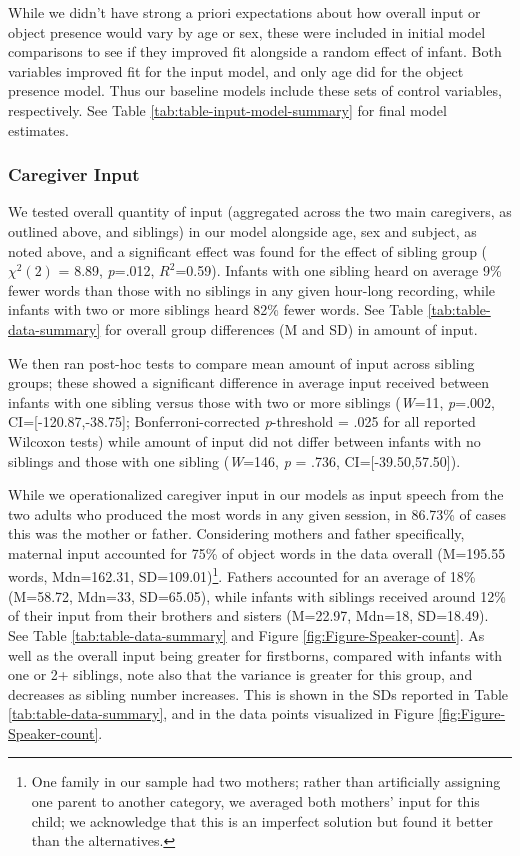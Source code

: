 \documentclass[
  man,mask,floatsintext]{apa6}
\begin{document}
While we didn't have strong a priori expectations about how overall input or object presence would vary by age or sex, these were included in initial model comparisons to see if they improved fit alongside a random effect of infant. Both variables improved fit for the input model, and only age did for the object presence model. Thus our baseline models include these sets of control variables, respectively. See Table \ref{tab:table-input-model-summary} for final model estimates.

\hypertarget{caregiver-input}{%
\subsubsection{Caregiver Input}\label{caregiver-input}}

We tested overall quantity of input (aggregated across the two main caregivers, as outlined above, and siblings) in our model alongside age, sex and subject, as noted above, and a significant effect was found for the effect of sibling group (\(\chi^2 (2)\) = 8.89, \emph{p}=.012, \(R^2\)=0.59). Infants with one sibling heard on average 9\% fewer words than those with no siblings in any given hour-long recording, while infants with two or more siblings heard 82\% fewer words. See Table \ref{tab:table-data-summary} for overall group differences (M and SD) in amount of input.

We then ran post-hoc tests to compare mean amount of input across sibling groups; these showed a significant difference in average input received between infants with one sibling versus those with two or more siblings (\emph{W}=11, \emph{p}=.002, CI={[}-120.87,-38.75{]}; Bonferroni-corrected \emph{p}-threshold = .025 for all reported Wilcoxon tests) while amount of input did not differ between infants with no siblings and those with one sibling (\emph{W}=146, \emph{p} = .736, CI={[}-39.50,57.50{]}).

While we operationalized caregiver input in our models as input speech from the two adults who produced the most words in any given session, in 86.73\% of cases this was the mother or father. Considering mothers and father specifically, maternal input accounted for 75\% of object words in the data overall (M=195.55 words, Mdn=162.31, SD=109.01)\footnote{One family in our sample had two mothers; rather than artificially assigning one parent to another category, we averaged both mothers' input for this child; we acknowledge that this is an imperfect solution but found it better than the alternatives.}. Fathers accounted for an average of 18\% (M=58.72, Mdn=33, SD=65.05), while infants with siblings received around 12\% of their input from their brothers and sisters (M=22.97, Mdn=18, SD=18.49). See Table \ref{tab:table-data-summary} and Figure \ref{fig:Figure-Speaker-count}. As well as the overall input being greater for firstborns, compared with infants with one or 2+ siblings, note also that the variance is greater for this group, and decreases as sibling number increases. This is shown in the SDs reported in Table \ref{tab:table-data-summary}, and in the data points visualized in Figure \ref{fig:Figure-Speaker-count}.
\end{document}
